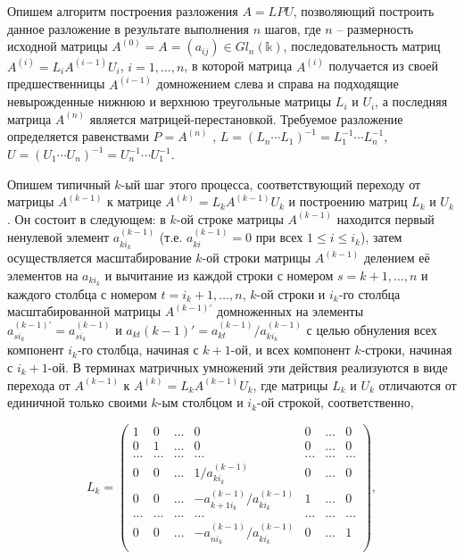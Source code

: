 Опишем алгоритм построения разложения $A=LPU$, позволяющий построить данное разложение в результате выполнения $n$ шагов, где $n$ – размерность исходной матрицы $A^{ (0) } = A = (a_{ij}) \in Gl_{n}(\mathbb{k})$, последовательность матриц $A^{ (i) } = L_{i} A^{(i-1)} U_{i}$, $i=1, \hdots, n$, в которой матрица $A^{ (i) }$ получается из своей предшественницы $A^{ (i-1) }$ домножением слева и справа на подходящие невырожденные нижнюю и верхнюю треугольные матрицы $L_i$ и $U_i$, а последняя матрица $A^{(n)}$ является матрицей-перестановкой. Требуемое разложение определяется равенствами $ P = A^{ (n) }$ , $ L = (L_n \dotsb L_1)^{-1} = L_1^{-1} \dotsb L_n^{-1}$, $U = (U_1 \dotsb U_n)^{-1} = U_n^{-1} \dotsb U_1^{-1}$.

Опишем типичный $k$-ый шаг этого процесса, соответствующий переходу от матрицы $A^{ (k-1) }$ к матрице $A^{ (k) } = L_k A^{ (k-1) } U_k$ и построению матриц $L_k$ и $U_k$. Он состоит в следующем: в $k$-ой строке матрицы $A^{ (k-1) }$ находится первый ненулевой элемент $a^{ (k-1) }_{k i_k}$ (т.е. $ a^{ (k-1) }_{ k i } = 0 $ при всех $1 \leq i \leq i_k$), затем осуществляется масштабирование $k$-ой строки матрицы $A^{ (k-1) }$ делением её элементов на $a_{k i_k}$ и вычитание из каждой строки с номером $s=k+1, \hdots, n$ и каждого столбца с номером $ t = i_k + 1, \hdots, n $, $k$-ой строки и $i_k$-го столбца масштабированной матрицы $A^{ (k-1)' }$ домноженных на элементы $ a^{ (k-1)' }_{ s i_k } = a^{ (k-1) }_{ s i_k} $ и $ a_{kt} (k-1)' = a^{(k-1)}_{kt} / a^{(k-1)}_{k i_k}$ с целью обнуления всех компонент $i_k$-го столбца, начиная с $k+1$-ой, и всех компонент $k$-строки, начиная с $i_k + 1$-ой. В терминах матричных умножений эти действия реализуются в виде перехода от $A^{ (k-1) }$ к $A^{ (k) } = L_k A^{ (k-1) } U_k$, где матрицы $L_k$ и $U_k$ отличаются от единичной только своими $k$-ым столбцом и $i_k$-ой строкой, соответственно,

\[
L_k = 
\begin{pmatrix}
	1 & 0 & \hdots & 0 & 0 & \hdots & 0 \\
	0 & 1 & \hdots & 0 & 0 & \hdots & 0 \\
	\hdots & \hdots & \hdots & \hdots & \hdots & \hdots & \hdots \\
	0 & 0 & \hdots & 1 / a^{(k-1)}_{k i_k} & 0 & \hdots & 0 \\
	0 & 0 & \hdots & -a^{(k-1)}_{k+1i_k}/a^{(k-1)}_{k i_k} & 1 & \hdots & 0 \\
	\hdots & \hdots & \hdots & \hdots & \hdots & \hdots & \hdots  \\
	0 & 0 & \hdots & -a^{(k-1)}_{n i_k} / a^{(k-1)}_{k i_k} & 0 & \hdots & 1 \\
\end{pmatrix},
\]

